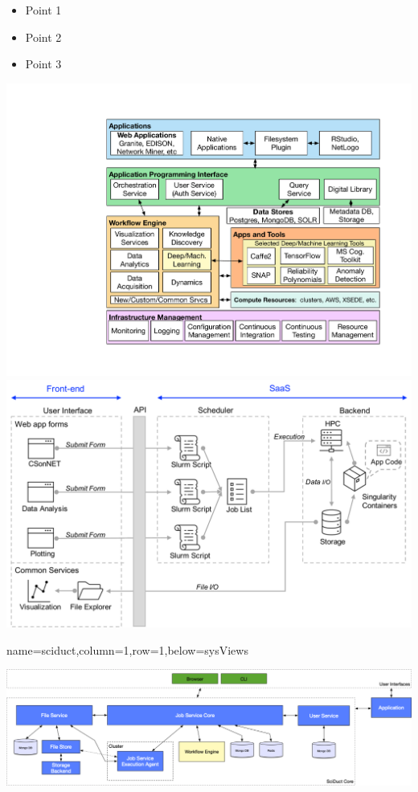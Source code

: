 \documentclass[landscape,paperwidth=70in,paperheight=46in,fontscale=0.225]{baposter} %
\begin{document}
\begin{poster}
{\begin{minipage}{.29\textwidth}
\begin{itemize}[leftmargin=*,noitemsep,topsep=0pt]
\item Point 1
\item Point 2
\item Point 3
\end{itemize}
\end{minipage}
\hfill
\begin{minipage}{.71\textwidth}
\includegraphics[scale=0.2]{figures/CINSArchV7-v02.pdf} 
\includegraphics[scale=0.2]{figures/netsci_ops_v6.pdf}
\end{minipage}

}

          {name=sciduct,column=1,row=1,below=sysViews}{
          
\includegraphics[scale=0.27]{figures/sciduct.png}

}
\end{poster}
\end{document}
